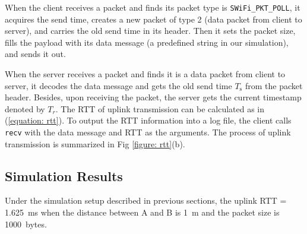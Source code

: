 \documentclass{article}
\begin{document}
When the client receives a packet and finds its packet type is
\lstinline|SWiFi_PKT_POLL|, it acquires the send time, creates a new packet of
type 2 (data packet from client to server), and carries the old send time in its
header. Then it sets the packet size, fills the payload with its data message
(a predefined string in our simulation), and sends it out.

When the server receives a packet and finds it is a data packet from client to
server, it decodes the data message and gets the old send time $T_\text{s}$ from
the packet header. Besides, upon receiving the packet, the server gets the current timestamp denoted by $T_r$. The RTT of uplink transmission can be calculated as in (\ref{equation: rtt}).
To output the RTT information into a log file, the client calls \lstinline|recv| with the data message and RTT as the arguments. The process of uplink transmission is summarized in Fig \ref{figure: rtt}(b).

\subsection{Simulation Results}
Under the simulation setup described in previous sections, the uplink RTT = \SI{1.625}{ms} when the distance between A and B is \SI{1}{m} and the packet size is \SI{1000}{bytes}. \\
\end{document}
